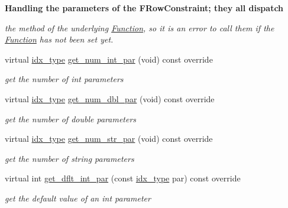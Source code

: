 \begin{Indent}\textbf{ Handling the parameters of the F\+Row\+Constraint; they all dispatch}\par
{\em the method of the underlying \mbox{\hyperlink{class_s_m_spp__di__unipi__it_1_1_function}{Function}}, so it is an error to call them if the \mbox{\hyperlink{class_s_m_spp__di__unipi__it_1_1_function}{Function}} has not been set yet. }\begin{DoxyCompactItemize}
\item 
virtual \mbox{\hyperlink{class_s_m_spp__di__unipi__it_1_1_thin_compute_interface_aa3d710629ad8c434286726ad810c3b47}{idx\+\_\+type}} \mbox{\hyperlink{class_s_m_spp__di__unipi__it_1_1_f_row_constraint_a3ad74d9506761eb2ca4c8a936fb7a1c5}{get\+\_\+num\+\_\+int\+\_\+par}} (void) const override
\begin{DoxyCompactList}\small\item\em get the number of int parameters \end{DoxyCompactList}\item 
virtual \mbox{\hyperlink{class_s_m_spp__di__unipi__it_1_1_thin_compute_interface_aa3d710629ad8c434286726ad810c3b47}{idx\+\_\+type}} \mbox{\hyperlink{class_s_m_spp__di__unipi__it_1_1_f_row_constraint_a842fd454acaded84baf6b77e0d61a950}{get\+\_\+num\+\_\+dbl\+\_\+par}} (void) const override
\begin{DoxyCompactList}\small\item\em get the number of double parameters \end{DoxyCompactList}\item 
virtual \mbox{\hyperlink{class_s_m_spp__di__unipi__it_1_1_thin_compute_interface_aa3d710629ad8c434286726ad810c3b47}{idx\+\_\+type}} \mbox{\hyperlink{class_s_m_spp__di__unipi__it_1_1_f_row_constraint_a91f0341f09d59b3023fc95122a625125}{get\+\_\+num\+\_\+str\+\_\+par}} (void) const override
\begin{DoxyCompactList}\small\item\em get the number of string parameters \end{DoxyCompactList}\item 
virtual int \mbox{\hyperlink{class_s_m_spp__di__unipi__it_1_1_f_row_constraint_a75dd1491b74c4b9476755e061dce3e04}{get\+\_\+dflt\+\_\+int\+\_\+par}} (const \mbox{\hyperlink{class_s_m_spp__di__unipi__it_1_1_thin_compute_interface_aa3d710629ad8c434286726ad810c3b47}{idx\+\_\+type}} par) const override
\begin{DoxyCompactList}\small\item\em get the default value of an int parameter \end{DoxyCompactList}\item 

\end{DoxyCompactItemize}
\end{Indent}
